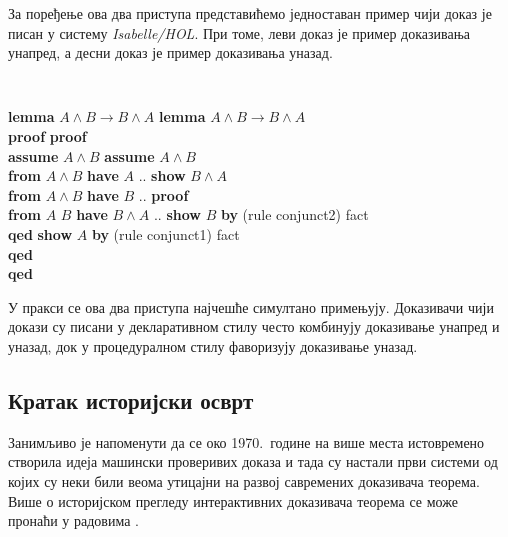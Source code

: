 За поређење ова два приступа представићемо једноставан пример чији
доказ је писан у систему \emph{Isabelle/HOL}. При томе, леви доказ је
пример доказивања унапред, а десни доказ је пример доказивања уназад.

\begin{small}
{\tt
\begin{tabbing}
\textbf{lem}\=\textbf{ma} $A \land B \longrightarrow B \land A$   \hspace{3cm} \=  \textbf{lem}\=\textbf{ma} $A \land B \longrightarrow B \land A$\\
\textbf{proof}                                                                  \>\> \textbf{proof} \\
\> \textbf{assume} $A \land B$                                                  \>\> \textbf{assume} $A \land B$ \\
\> \textbf{from} $A \land B$ \textbf{have} $A$ ..                               \>\> \textbf{show} $B \land A$ \\
\> \textbf{from} $A \land B$ \textbf{have} $B$ ..                               \>\> \textbf{pro}\=\textbf{of}\\
\> \textbf{from} $A$ $B$ \textbf{have} $B \land A$ ..                           \>\>\> \textbf{show} $B$ \textbf{by} (rule conjunct2) fact\\
\textbf{qed}                                                                    \>\>\>\> \textbf{show} $A$ \textbf{by} (rule conjunct1) fact\\
                                                                                \>\>\> \textbf{qed} \\
                                                                                \>\> \textbf{qed} \\
\end{tabbing}
}
\end{small}


У пракси се ова два приступа најчешће симултано примењују. Доказивачи
чији докази су писани у декларативном стилу често комбинују доказивање
унапред и уназад, док у процедуралном стилу фаворизују доказивање
уназад.


\subsection{Кратак историјски осврт}

Занимљиво је напоменути да се око 1970.~године на више места
истовремено створила идеја машински проверивих доказа и тада су
настали први системи од којих су неки били веома утицајни на развој
савремених доказивача теорема. Више о историјском прегледу
интерактивних доказивача теорема се може пронаћи у радовима
\cite{geuvers2009proof, maricsurvey, avigad2014formally,
  gordon2000lcf}.

